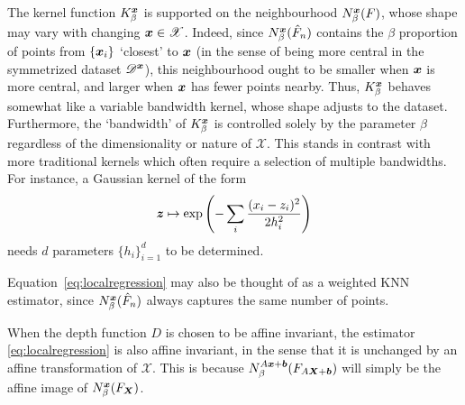 The kernel function $K^{\bm{x}}_\beta$ is supported on the neighbourhood
$N^{\bm{x}}_\beta(F)$, whose shape may vary with changing $\bm{x} \in \mathscr{X}$.
Indeed, since $N^{\bm{x}}_\beta(\hat{F}_n)$ contains the $\beta$ proportion of
points from $\{\bm{x}_i\}$ `closest' to $\bm{x}$ (in the sense of being more central
in the symmetrized dataset $\mathscr{D}^{\bm{x}}$), this neighbourhood ought to
be smaller when $\bm{x}$ is more central, and larger when $\bm{x}$ has fewer points
nearby.
Thus, $K^{\bm{x}}_\beta$ behaves somewhat like a variable bandwidth kernel, whose
shape adjusts to the dataset.
Furthermore, the `bandwidth' of $K^{\bm{x}}_\beta$ is controlled solely by the
parameter $\beta$ regardless of the dimensionality or nature of $\mathscr{X}$.
This stands in contrast with more traditional kernels which often require a
selection of multiple bandwidths.
For instance, a Gaussian kernel of the form
\begin{equation}
    \bm{z} \mapsto \exp\left(-\sum_i \frac{(x_i - z_i)^2}{2h_i^2}\right)
    \label{eq:kernel_gaussian}
\end{equation}
needs $d$ parameters $\{h_i\}_{i = 1}^d$ to be determined.

Equation~\ref{eq:localregression} may also be thought of as a weighted KNN
estimator, since $N^{\bm{x}}_\beta(\hat{F}_n)$ always captures the same number of
points.

When the depth function $D$ is chosen to be affine invariant, the estimator
\ref{eq:localregression} is also affine invariant, in the sense that it is
unchanged by an affine transformation of $\mathscr{X}$.
This is because $N^{A\bm{x} + \bm{b}}_\beta(F_{A\bm{X} + \bm{b}})$ will simply be
the affine image of $N^{\bm{x}}_\beta(F_{\bm{X}})$.
